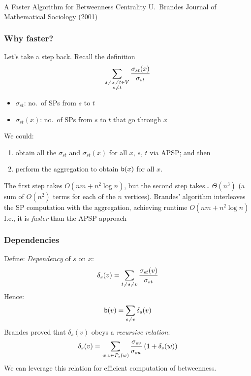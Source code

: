 \begin{frame}
  \centering
  \vfill
  {\huge A Faster Algorithm for Betweenness Centrality}
  \vfill
  {\Large U.~Brandes}
  \vfill
  {\large Journal of Mathematical Sociology (2001)}
  \vfill
\end{frame}

\begin{frame}
  \frametitle{Why {\red faster}?}
  \vfill
  Let's take a step back. Recall the definition
  \[
    \sum_{\substack{s\neq x\neq t \in V\\s\neq t}}\frac{\sigma_{st}(x)}{\sigma_{st}}
    \vspace{-10pt}
  \]
  \begin{itemize}
    \item $\sigma_{st}$: no.~of SPs from $s$ to $t$
    \item $\sigma_{st}(x)$: no.~of SPs from $s$ to $t$ that go through $x$
  \end{itemize}
  \pause
  We could:
  \begin{enumerate}
    \item obtain all the $\sigma_{st}$ and $\sigma_{st}(x)$ for all $x$, $s$,
      $t$ via APSP; and then
    \item perform the aggregation to obtain $\mathsf{b}(x)$ for all $x$.
  \end{enumerate}
  \pause
  The first step takes $O(nm+n^2\log n)$, but the second step takes\ldots\pause
  $\Theta(n^3)$ (a sum of $O(n^2)$ terms for each of the $n$ vertices).
  \pause
  \vfill
  Brandes' algorithm interleaves the SP computation with the aggregation,
  achieving runtime $O(nm+n^2\log n)$\\
  \quad I.e., it is \emph{faster} than the APSP approach
\end{frame}

\begin{frame}
  \frametitle{Dependencies}
  Define: \emph{Dependency} of $s$ on $x$:
  \[
    \delta_s(v)=\sum_{t\neq s\neq v}\frac{\sigma_{st}(v)}{\sigma_{st}}
  \]
  Hence:
  \[
    \mathsf{b}(v)=\sum_{s\neq v}\delta_s(v)
  \]
  \pause
  Brandes proved that $\delta_s(v)$ obeys a \emph{recursive relation}:
  \[
    \delta_s(v)=\sum_{w:v\in P_s(w)}\frac{\sigma_{sv}}{\sigma_{sw}}\left(1+\delta_s(w)\right)
  \]
  We can leverage this relation for efficient computation of betweenness.
\end{frame}

